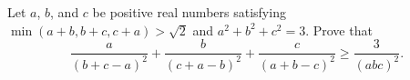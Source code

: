 Let $a$, $b$, and $c$ be positive real numbers satisfying $\min(a+b, b+c, c+a) > \sqrt{2}$ and $a^2 + b^2 + c^2 = 3$. Prove that
\[
\frac{a}{(b+c-a)^2} + \frac{b}{(c+a-b)^2} + \frac{c}{(a+b-c)^2} \geq \frac{3}{(abc)^2}.
\]
